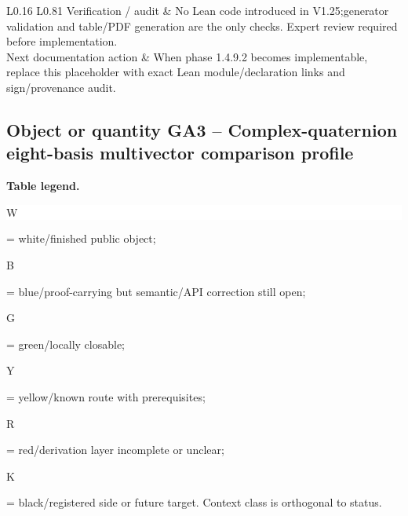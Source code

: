 \begin{longtable}{L{0.16\linewidth} L{0.81\linewidth}}
\hline\addlinespace[0.20em]
Verification /\allowbreak{} audit & No Lean code introduced in V1.25;\newline generator validation and table/\allowbreak{}PDF generation are the only checks. Expert review required before implementation.\\
\hline\addlinespace[0.20em]
Next documentation action & When phase 1.4.9.2 becomes implementable, replace this placeholder with exact Lean module/\allowbreak{}declaration links and sign/\allowbreak{}provenance audit.\\
\hline\addlinespace[0.20em]
\end{longtable}
\subsection*{Object or quantity GA3 -- Complex-quaternion eight-basis multivector comparison profile}
\hypertarget{objproof:GA3}{}
\par\smallskip\noindent\begin{minipage}{0.99\linewidth}\footnotesize\raggedright\textbf{Table legend.} \colorbox{white}{\strut W} = white/finished public object; \colorbox{cyan!20}{\strut B} = blue/proof-carrying but semantic/API correction still open; \colorbox{green!18}{\strut G} = green/locally closable; \colorbox{yellow!25}{\strut Y} = yellow/known route with prerequisites; \colorbox{red!20}{\strut R} = red/derivation layer incomplete or unclear; \colorbox{black!18}{\strut K} = black/registered side or future target. Context class is orthogonal to status.\end{minipage}\par\vspace{0.25em}
